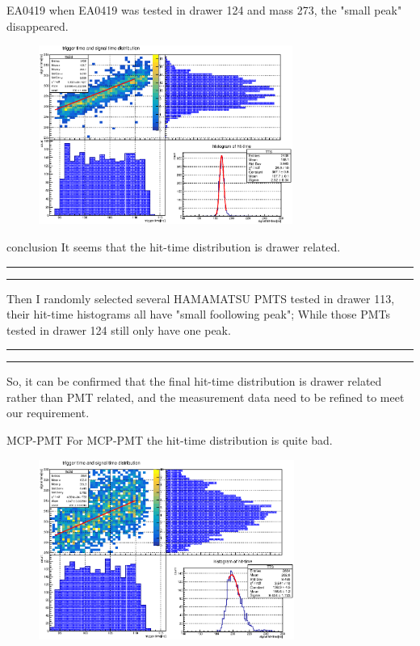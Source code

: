 \documentclass[11pt,compress,xcolor=x11names,UTF8]{beamer}
\begin{document}
\begin{frame}{EA0419}
when EA0419 was tested in drawer 124 and mass 273, the "small peak" disappeared.
\begin{figure}
\centering
\includegraphics[width=0.74\textwidth]{ea0419-273} %
\end{figure}
\end{frame}
\begin{frame}{conclusion}
It seems that the hit-time distribution is drawer related.

\vspace{.5cm}
\hrule{}
\hrule{}
\vspace{.5cm}
Then I randomly selected several HAMAMATSU PMTS tested in drawer 113, their hit-time histograms all have "small foollowing peak"; While those PMTs tested in drawer 124 still only have one peak. 

\vspace{.5cm}
\hrule{}
\hrule{}
\vspace{.5cm}
\alert{So, it can be confirmed that the final hit-time distribution is drawer related rather than PMT related, and the measurement data need to be refined to meet our requirement.}
\end{frame}
\begin{frame}{MCP-PMT}
For MCP-PMT the hit-time distribution is quite bad.
\begin{figure}
\centering
\includegraphics[width=0.7451\textwidth]{pa1703-1645} %
\end{figure}
\end{frame}
\end{document}
